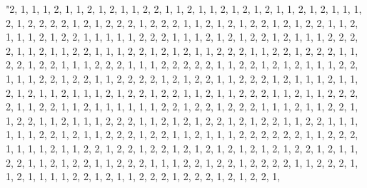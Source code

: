 \documentclass[
]{article}
\begin{document}
\begin{Schunk}
\begin{Soutput}
                                                                                                                                                                                                                                                                                                                                                                                                                                                                                                                                                                                                                                                                                                                                                                                                                                                                                                                                                                                                                                                                                                                                                                                                                                                                                                                                                                                                                                                                                                                                                                                                                                                                                                                                                                                                                                                                                                                                                                                                                                                                                                                                                            "2, 1, 1, 1, 2, 1, 1, 2, 1, 2, 1, 1, 2, 2, 1, 1, 2, 1, 1, 2, 1, 2, 1, 2, 1, 1, 2, 1, 2, 1, 1, 1, 2, 1, 2, 2, 2, 2, 1, 2, 1, 2, 2, 2, 1, 2, 2, 2, 1, 1, 2, 1, 2, 1, 2, 2, 1, 2, 1, 2, 2, 1, 1, 2, 1, 1, 1, 2, 1, 2, 2, 1, 1, 1, 1, 1, 2, 2, 2, 1, 1, 1, 2, 1, 2, 1, 2, 2, 1, 2, 1, 1, 1, 2, 2, 2, 2, 1, 1, 2, 1, 1, 2, 2, 1, 1, 1, 2, 2, 1, 2, 1, 2, 1, 1, 2, 2, 2, 1, 1, 2, 2, 1, 2, 2, 2, 1, 1, 2, 2, 1, 2, 2, 1, 1, 1, 2, 2, 2, 1, 1, 1, 2, 2, 2, 2, 2, 1, 1, 2, 2, 1, 2, 1, 2, 1, 1, 1, 2, 2, 1, 1, 1, 2, 2, 1, 2, 2, 1, 1, 2, 2, 2, 2, 1, 2, 1, 2, 2, 1, 1, 2, 2, 2, 1, 2, 1, 1, 1, 2, 1, 1, 2, 1, 2, 1, 1, 2, 1, 1, 1, 2, 1, 2, 2, 1, 2, 2, 1, 1, 2, 1, 1, 2, 2, 2, 1, 1, 2, 1, 1, 2, 2, 2, 2, 1, 1, 2, 2, 1, 1, 2, 1, 1, 1, 1, 1, 1, 2, 2, 1, 2, 2, 1, 2, 2, 2, 1, 1, 1, 2, 1, 1, 2, 2, 1, 1, 2, 2, 1, 1, 2, 1, 1, 1, 2, 2, 2, 1, 1, 2, 1, 2, 1, 2, 2, 1, 2, 1, 2, 2, 1, 1, 2, 2, 1, 1, 1, 1, 1, 1, 2, 2, 1, 2, 1, 1, 2, 2, 2, 1, 2, 2, 1, 1, 2, 1, 1, 1, 2, 2, 2, 2, 2, 2, 1, 1, 2, 2, 2, 1, 1, 1, 1, 2, 1, 1, 2, 2, 1, 2, 2, 1, 2, 2, 1, 2, 1, 2, 1, 2, 1, 2, 1, 2, 1, 2, 2, 1, 2, 1, 1, 2, 2, 1, 1, 2, 1, 2, 2, 1, 1, 2, 2, 2, 1, 1, 1, 2, 2, 1, 2, 2, 1, 2, 2, 2, 2, 1, 1, 2, 2, 2, 1, 1, 2, 1, 1, 1, 1, 2, 2, 1, 2, 1, 1, 2, 2, 2, 1, 2, 2, 2, 1, 2, 1, 2, 2, 1, 
\end{Soutput}
\end{Schunk}
\end{document}
